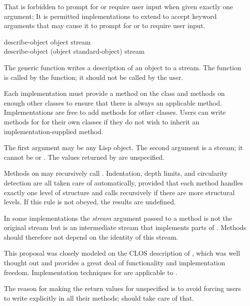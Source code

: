 That  is forbidden
to prompt for or require user input when given exactly one argument;
It is permitted implementations
to extend  to accept keyword arguments that may cause
it to prompt for or to require user input.

\begin{defun}
describe-object object stream \\
describe-object (object standard-object) stream

The generic function  writes a description of an object to a
  stream.  The function  is called by the  function; it
  should not be called by the user.

  Each implementation must provide a method on the class
   and methods on enough other classes to ensure that
  there is always an applicable method.  Implementations are free to add
  methods for other classes.  Users can write methods for  for
  their own classes if they do not wish to inherit an implementation-supplied
  method.

   The first argument may be any Lisp object.  The second argument is a stream; it
   cannot be  or .
   The values returned by  are unspecified.

   Methods on  may recursively call .  Indentation,
   depth limits, and circularity detection are all taken care of automatically,
   provided that each method handles exactly one level of structure and calls
    recursively if there are more structural levels.
   If this rule is not obeyed, the results are undefined.

   In some implementations the \emph{stream} argument passed to a 
   method is not the original stream but is an intermediate stream that
   implements parts of .  Methods should therefore not depend on the
   identity of this stream.

\beforenoterule
\begin{rationale}
 This proposal was closely modeled on the CLOS description of ,
 which was well thought out and provides a great deal of functionality and
 implementation freedom.  Implementation techniques for
  are applicable to .

 The reason for making the return values for  unspecified is to
 avoid forcing users to write  explicitly in all their methods;
  should take care of that.
\end{rationale}
\afternoterule
\end{defun}

